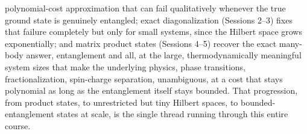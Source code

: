 \documentclass[all_sessions.tex]{subfiles}
\begin{document}
\begin{itemize}[nosep]
    polynomial-cost approximation that can fail qualitatively whenever the true ground state is
    genuinely entangled; exact diagonalization (Sessions 2--3) fixes that failure completely but
    only for small systems, since the Hilbert space grows exponentially; and matrix product states
    (Sessions 4--5) recover the exact many-body answer, entanglement and all, at the large,
    thermodynamically meaningful system sizes that make the underlying physics, phase transitions,
    fractionalization, spin-charge separation, unambiguous, at a cost that stays polynomial as long
    as the entanglement itself stays bounded. That progression, from product states, to unrestricted
    but tiny Hilbert spaces, to bounded-entanglement states at scale, is the single thread running
    through this entire course.
\end{itemize}
\end{document}
